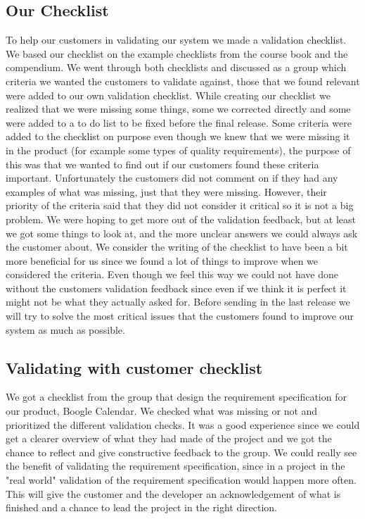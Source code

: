 \documentclass[a4paper]{article}
\begin{document}
			\subsection{Our Checklist}
				To help our customers in validating our system we made a validation checklist. We based our checklist on the example checklists from the course book and the compendium. We went through both checklists and discussed as a group which criteria we wanted the customers to validate against, those that we found relevant were added to our own validation checklist. While creating our checklist we realized that we were missing some things, some we corrected directly and some were added to a to do list to be fixed before the final release. Some criteria were added to the checklist on purpose even though we knew that we were missing it in the product (for example some types of quality requirements), the purpose of this was that we wanted to find out if our customers found these criteria important. Unfortunately the customers did not comment on if they had any examples of what was missing, just that they were missing. However, their priority of the criteria said that they did not consider it critical so it is not a big problem. We were hoping to get more out of the validation feedback, but at least we got some things to look at, and the more unclear answers we could always ask the customer about. We consider the writing of the checklist to have been a bit more beneficial for us since we found a lot of things to improve when we considered the criteria. Even though we feel this way we could not have done without the customers validation feedback since even if we think it is perfect it might not be what they actually asked for.
				Before sending in the last release we will try to solve the most critical issues that the customers found to improve our system as much as possible.
				 			
			\subsection{Validating with customer checklist}
				We got a checklist from the group that design the requirement specification for our product, Boogle Calendar. We checked what was missing or not and prioritized the different validation checks. It was a good experience since we could get a clearer overview of what they had made of the project and we got the chance to reflect and give constructive feedback to the group. We could really see the benefit of validating the requirement specification, since in a project in the "real world" validation of the requirement specification would happen more often. This will give the customer and the developer an acknowledgement of what is finished and a chance to lead the project in the right direction.
\end{document}
